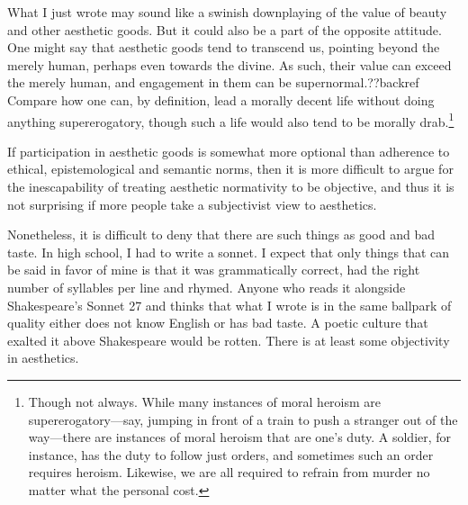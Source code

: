 What I just wrote may sound like a swinish downplaying of the value of beauty and other aesthetic
goods. But it could also be a part of the opposite attitude. One might say that aesthetic goods tend to 
transcend us, pointing beyond the merely human, perhaps even towards the divine. As such, their value can
exceed the merely human, and engagement in them can be supernormal.??backref Compare how one can, by definition,
lead a morally decent life without doing anything supererogatory, though such a life would also tend to be
morally drab.\footnote{Though not always. While many instances of moral heroism are supererogatory---say, 
jumping in front of a train to push a stranger out of the way---there are instances of moral heroism
that are one's duty. A soldier, for instance, has the duty to follow just orders, and sometimes such an order
requires heroism. Likewise, we are all required to refrain from murder no matter what the personal cost.}

If participation in aesthetic goods is somewhat more optional than adherence to ethical, epistemological
and semantic norms, then it is more difficult to argue for the inescapability of treating aesthetic normativity
to be objective, and thus it is not surprising if more people take a subjectivist view to aesthetics.

Nonetheless, it is difficult to deny that there are such things as good and bad taste. In high school, I had
to write a sonnet. I expect that only things that can be said in favor of mine is that it was grammatically
correct, had the right number of syllables per line and rhymed. Anyone who reads it alongside Shakespeare's 
Sonnet 27 and thinks that what I wrote is in the same ballpark of quality either does not know English or has bad taste. A poetic culture 
that exalted it above Shakespeare would be rotten.  There is at least some objectivity in aesthetics.

